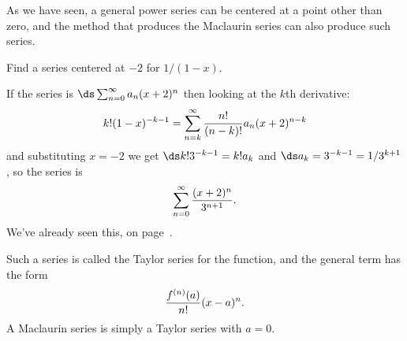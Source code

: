 As we have seen, a general power series can be centered at a point
other than zero, and the method that produces the Maclaurin series can
also produce such series.

\begin{example} Find a series centered at $-2$ for $1/(1-x)$.

If the series is $\ds\sum_{n=0}^\infty a_n(x+2)^n$ then looking at the
$k$th derivative:
$$k!(1-x)^{-k-1}=\sum_{n=k}^\infty {n!\over (n-k)!}a_n(x+2)^{n-k}$$
and substituting $x=-2$ we get
$\ds k!3^{-k-1}=k!a_k$ and $\ds a_k=3^{-k-1}=1/3^{k+1}$, so the series is
$$\sum_{n=0}^\infty {(x+2)^n\over 3^{n+1}}.$$
We've already seen this, on page~.
\end{example}

Such a series is called the 
{\dfont Taylor series\/} 
for the function,
and the general term has the form
$${f^{(n)}(a)\over n!}(x-a)^n.$$
A Maclaurin series is simply a Taylor series with $a=0$.

